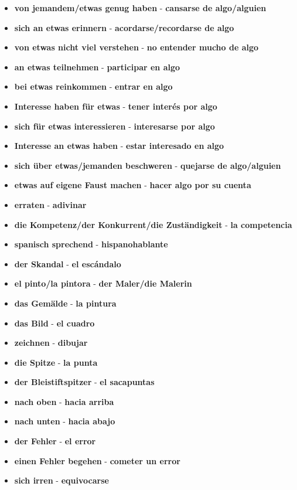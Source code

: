 \documentclass{article}
\begin{document}
\begin{multicols}{2}
\begin{itemize}
		\item{\textbf{von jemandem/etwas genug haben} - \textbf{cansarse de algo/alguien}}
		\item{\textbf{sich an etwas erinnern} - \textbf{acordarse/recordarse de algo}}
		\item{\textbf{von etwas nicht viel verstehen} - \textbf{no entender mucho de algo}}
		\item{\textbf{an etwas teilnehmen} - \textbf{participar en algo}}
		\item{\textbf{bei etwas reinkommen} - \textbf{entrar en algo}}
		\item{\textbf{Interesse haben für etwas} - \textbf{tener interés por algo}}
		\item{\textbf{sich für etwas interessieren} - \textbf{interesarse por algo}}
		\item{\textbf{Interesse an etwas haben} - \textbf{estar interesado en algo}}
		\item{\textbf{sich über etwas/jemanden beschweren} - \textbf{quejarse de algo/alguien}}
		\item{\textbf{etwas auf eigene Faust machen} - \textbf{hacer algo por su cuenta}}
		\item{\textbf{erraten} - \textbf{adivinar}}
		\item{\textbf{die Kompetenz/der Konkurrent/die Zuständigkeit} - \textbf{la competencia}}
		\item{\textbf{spanisch sprechend} - \textbf{hispanohablante}}
		\item{\textbf{der Skandal} - \textbf{el escándalo}}
		\item{\textbf{el pinto/la pintora} - \textbf{der Maler/die Malerin}}
		\item{\textbf{das Gemälde} - \textbf{la pintura}}
		\item{\textbf{das Bild} - \textbf{el cuadro}}
		\item{\textbf{zeichnen} - \textbf{dibujar}}
		\item{\textbf{die Spitze} - \textbf{la punta}}
		\item{\textbf{der Bleistiftspitzer} - \textbf{el sacapuntas}}
		\item{\textbf{nach oben} - \textbf{hacia arriba}}
		\item{\textbf{nach unten} - \textbf{hacia abajo}}
		\item{\textbf{der Fehler} - \textbf{el error}}
		\item{\textbf{einen Fehler begehen} - \textbf{cometer un error}}
		\item{\textbf{sich irren} - \textbf{equivocarse}}

\end{itemize}
\end{multicols}
\end{document}
